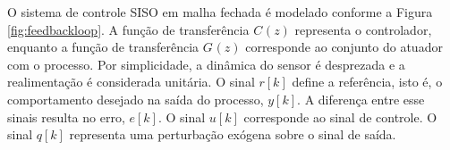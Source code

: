 \documentclass[repeatfields,oneside]{tcc}
\newcommand{\myC}[2][]{ C_{#1} \left( #2 \right) }
\newcommand{\myG}[2][]{ G_{#1} \left( #2 \right) }
\begin{document}
O sistema de controle SISO em malha fechada é modelado conforme a Figura \ref{fig:feedbackloop}.
A função de transferência $\myC{z}$ representa o controlador, enquanto a função de transferência $\myG{z}$ corresponde ao conjunto do atuador com o processo.
Por simplicidade, a dinâmica do sensor é desprezada e a realimentação é considerada unitária.
O sinal $r[k]$ define a referência, isto é, o comportamento desejado na saída do processo, $y[k]$.
A diferença entre esse sinais resulta no erro, $e[k]$.
O sinal $u[k]$ corresponde ao sinal de controle.
O sinal $q[k]$ representa uma perturbação exógena sobre o sinal de saída.





\end{document}
